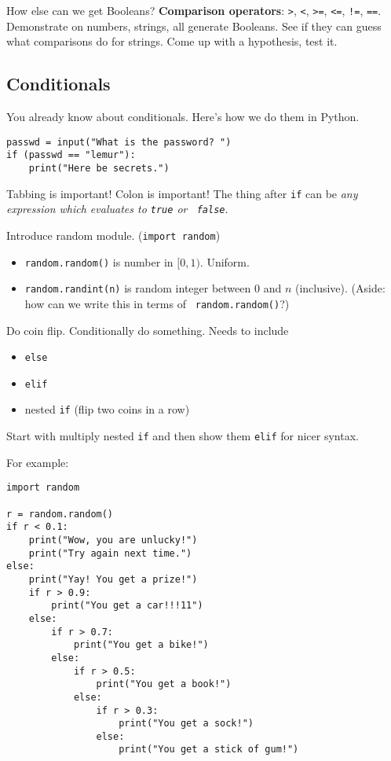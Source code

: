 \documentclass{article}
\begin{document}
How else can we get Booleans?  \textbf{Comparison operators}:
\verb|>|, \verb|<|, \verb|>=|, \verb|<=|, \verb|!=|, \verb|==|.
Demonstrate on numbers, strings, all generate Booleans.  See if they
can guess what comparisons do for strings.  Come up with a hypothesis,
test it.

\subsection*{Conditionals}

You already know about conditionals.  Here's how we do them in Python.

\begin{verbatim}
passwd = input("What is the password? ")
if (passwd == "lemur"):
    print("Here be secrets.")
\end{verbatim}

Tabbing is important!  Colon is important!  The thing after {\tt if}
can be \emph{any expression which evaluates to {\tt true} or {\tt
    false}}.

Introduce random module. ({\tt import random})
\begin{itemize}
\item {\tt random.random()} is number in $[0,1)$. Uniform.
\item {\tt random.randint(n)} is random integer between $0$ and $n$
  (inclusive).  (Aside: how can we write this in terms of {\tt
    random.random()}?)
\end{itemize}
Do coin flip.  Conditionally do something.  Needs to include
\begin{itemize}
\item {\tt else}
\item {\tt elif}
\item nested {\tt if}  (flip two coins in a row)
\end{itemize}

Start with multiply nested {\tt if} and then show them {\tt elif} for
nicer syntax.

For example:
\begin{verbatim}
import random

r = random.random()
if r < 0.1:
    print("Wow, you are unlucky!")
    print("Try again next time.")
else:
    print("Yay! You get a prize!")
    if r > 0.9:
        print("You get a car!!!11")
    else:
        if r > 0.7:
            print("You get a bike!")
        else:
            if r > 0.5:
                print("You get a book!")
            else:
                if r > 0.3:
                    print("You get a sock!")
                else:
                    print("You get a stick of gum!")
\end{verbatim}
\end{document}
